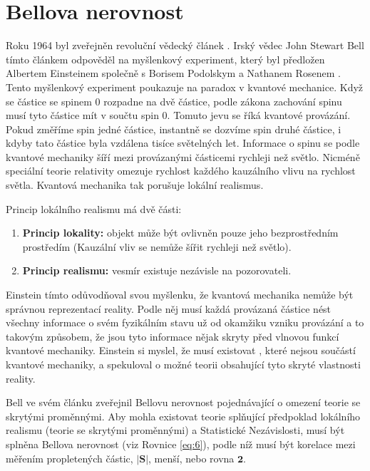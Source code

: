 \section{Bellova nerovnost}

Roku 1964 byl zveřejněn revoluční vědecký článek \parencite{bellineq}. Irský vědec John Stewart Bell tímto článkem odpověděl na myšlenkový experiment, který byl předložen Albertem Einsteinem společně s Borisem Podolskym a Nathanem Rosenem \parencite*{eprpar}. Tento myšlenkový experiment poukazuje na paradox v kvantové mechanice. Když se částice se spinem 0 rozpadne na dvě částice, podle zákona zachování spinu musí tyto částice mít v součtu spin 0. Tomuto jevu se říká kvantové provázání. Pokud změříme spin jedné částice, instantně se dozvíme spin druhé částice, i kdyby tato částice byla vzdálena tisíce světelných let. Informace o spinu se podle kvantové mechaniky šíří mezi provázanými částicemi rychleji než světlo. Nicméně speciální teorie relativity omezuje rychlost každého kauzálního vlivu na rychlost světla. Kvantová mechanika tak porušuje lokální realismus.

Princip lokálního realismu má dvě části:
    \begin{enumerate}
        \item \textbf{Princip lokality:} objekt může být ovlivněn pouze jeho bezprostředním prostředím (Kauzální vliv se nemůže šířit rychleji než světlo). \parencite{lokalita}
        \item \textbf{Princip realismu:} vesmír existuje nezávisle na pozorovateli. \parencite{realismus}
    \end{enumerate}
    
Einstein tímto odůvodňoval svou myšlenku, že kvantová mechanika nemůže být správnou reprezentací reality. Podle něj musí každá provázaná částice nést všechny informace o svém fyzikálním stavu už od okamžiku vzniku provázání a to takovým způsobem, že jsou tyto informace nějak skryty před vlnovou funkcí kvantové mechaniky. Einstein si myslel, že musí existovat , které nejsou součástí kvantové mechaniky, a spekuloval o možné teorii obsahující tyto skryté vlastnosti reality.

Bell ve svém článku \parencite*{bellineq} zveřejnil Bellovu nerovnost pojednávající o omezení teorie se skrytými proměnnými. Aby mohla existovat teorie splňující předpoklad lokálního realismu (teorie se skrytými proměnnými) a Statistické Nezávislosti, musí být splněna Bellova nerovnost (viz Rovnice \ref{eq:6}), podle níž musí být korelace mezi měřením propletených částic, $\bm{|S|}$, menší, nebo rovna $\bm{2}$.

